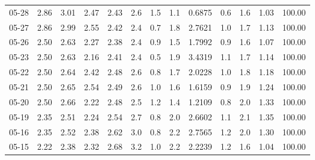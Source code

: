 \begin{threeparttable}
{\begin{tabular}{lrrrrrrrrrrrr}
  05-28 &          2.86 &          3.01 &          2.47 &        2.43 &                 2.6 &                 1.5 &        1.1 &       0.6875 &                 0.6 &              1.6 &            1.03 &                 100.00 \\
  05-27 &          2.86 &          2.99 &          2.55 &        2.42 &                 2.4 &                 0.7 &        1.8 &       2.7621 &                 1.0 &              1.7 &            1.13 &                 100.00 \\
  05-26 &          2.50 &          2.63 &          2.27 &        2.38 &                 2.4 &                 0.9 &        1.5 &       1.7992 &                 0.9 &              1.6 &            1.07 &                 100.00 \\
  05-23 &          2.50 &          2.63 &          2.16 &        2.41 &                 2.4 &                 0.5 &        1.9 &       3.4319 &                 1.1 &              1.7 &            1.14 &                 100.00 \\
  05-22 &          2.50 &          2.64 &          2.42 &        2.48 &                 2.6 &                 0.8 &        1.7 &       2.0228 &                 1.0 &              1.8 &            1.18 &                 100.00 \\
  05-21 &          2.50 &          2.65 &          2.54 &        2.49 &                 2.6 &                 1.0 &        1.6 &       1.6159 &                 0.9 &              1.9 &            1.24 &                 100.00 \\
  05-20 &          2.50 &          2.66 &          2.22 &        2.48 &                 2.5 &                 1.2 &        1.4 &       1.2109 &                 0.8 &              2.0 &            1.33 &                 100.00 \\
  05-19 &          2.35 &          2.51 &          2.24 &        2.54 &                 2.7 &                 0.8 &        2.0 &       2.6602 &                 1.1 &              2.1 &            1.35 &                 100.00 \\
  05-16 &          2.35 &          2.52 &          2.38 &        2.62 &                 3.0 &                 0.8 &        2.2 &       2.7565 &                 1.2 &              2.0 &            1.30 &                 100.00 \\
  05-15 &          2.22 &          2.38 &          2.32 &        2.68 &                 3.2 &                 1.0 &        2.2 &       2.2239 &                 1.2 &              1.6 &            1.04 &                 100.00 \\

\end{tabular}}
\end{threeparttable}
